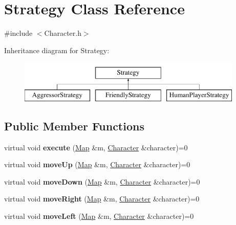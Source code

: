 \hypertarget{classStrategy}{}\section{Strategy Class Reference}
\label{classStrategy}


{\ttfamily \#include $<$Character.\+h$>$}

Inheritance diagram for Strategy\+:\begin{figure}[H]
\begin{center}
\leavevmode
\includegraphics[height=2.000000cm]{classStrategy}
\end{center}
\end{figure}
\subsection*{Public Member Functions}
\begin{DoxyCompactItemize}
\item 
\hypertarget{classStrategy_a02ebf45b3c8760d55796a72831dd9b49}{}\label{classStrategy_a02ebf45b3c8760d55796a72831dd9b49} 
virtual void {\bfseries execute} (\hyperlink{classMap}{Map} \&m, \hyperlink{classCharacter}{Character} \&character)=0
\item 
\hypertarget{classStrategy_a1f92b4c56087e4cc880765a7ffef451a}{}\label{classStrategy_a1f92b4c56087e4cc880765a7ffef451a} 
virtual void {\bfseries move\+Up} (\hyperlink{classMap}{Map} \&m, \hyperlink{classCharacter}{Character} \&character)=0
\item 
\hypertarget{classStrategy_a68e1fec84059fe461622f3be224de5fe}{}\label{classStrategy_a68e1fec84059fe461622f3be224de5fe} 
virtual void {\bfseries move\+Down} (\hyperlink{classMap}{Map} \&m, \hyperlink{classCharacter}{Character} \&character)=0
\item 
\hypertarget{classStrategy_a559e61db1212d7b60955065f0b06ae95}{}\label{classStrategy_a559e61db1212d7b60955065f0b06ae95} 
virtual void {\bfseries move\+Right} (\hyperlink{classMap}{Map} \&m, \hyperlink{classCharacter}{Character} \&character)=0
\item 
\hypertarget{classStrategy_ada942b5564bfef4bbd528ce1e5f15c10}{}\label{classStrategy_ada942b5564bfef4bbd528ce1e5f15c10} 
virtual void {\bfseries move\+Left} (\hyperlink{classMap}{Map} \&m, \hyperlink{classCharacter}{Character} \&character)=0
\end{DoxyCompactItemize}


